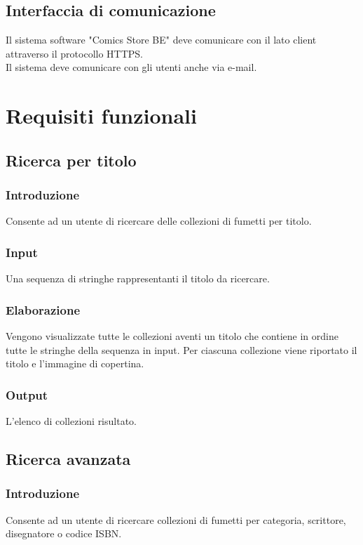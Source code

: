 \documentclass{scrreprt}
\begin{document}
\section{Interfaccia di comunicazione}
Il sistema software "Comics Store BE" deve comunicare con il lato client attraverso il protocollo HTTPS.\\
Il sistema deve comunicare con gli utenti anche via e-mail.


\chapter{Requisiti funzionali}

\section{Ricerca per titolo}\label{ric_titolo}

\subsection*{Introduzione}
Consente ad un utente di ricercare delle collezioni di fumetti per titolo.
\subsection*{Input}
Una sequenza di stringhe rappresentanti il titolo da ricercare.
\subsection*{Elaborazione}
Vengono visualizzate tutte le collezioni aventi un titolo che contiene in ordine tutte le stringhe della sequenza
in input. Per ciascuna collezione viene riportato il titolo e l'immagine di copertina.
\subsection*{Output}
L'elenco di collezioni risultato.

\section{Ricerca avanzata}

\subsection*{Introduzione}
Consente ad un utente di ricercare collezioni di fumetti per categoria, scrittore, disegnatore o codice ISBN.
\end{document}
